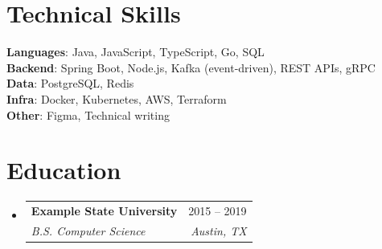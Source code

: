 \documentclass[letterpaper,11pt]{article}
\makeatletter
\newcommand{\resumeSubheading}[4]{
  \vspace{-2pt}\item
    \begin{tabular*}{0.97\textwidth}[t]{l@{\extracolsep{\fill}}r}
      \textbf{#1} & #2 \\
      \textit{\small#3} & \textit{\small #4} \\
    \end{tabular*}\vspace{-7pt}
}
\newcommand{\resumeSubHeadingListStart}{\begin{itemize}[leftmargin=0.15in, label={}]}
\newcommand{\resumeSubHeadingListEnd}{\end{itemize}}
\makeatother
\begin{document}
\section{Technical Skills}
 \begin{itemize}[leftmargin=0.15in, label={}]
    \small{\item{
     \textbf{Languages}{: Java, JavaScript, TypeScript, Go, SQL} \\
     \textbf{Backend}{: Spring Boot, Node.js, Kafka (event-driven), REST APIs, gRPC} \\
     \textbf{Data}{: PostgreSQL, Redis} \\
     \textbf{Infra}{: Docker, Kubernetes, AWS, Terraform} \\
     \textbf{Other}{: Figma, Technical writing}
    }}
 \end{itemize}

\section{Education}
  \resumeSubHeadingListStart
    \resumeSubheading
      {Example State University}{2015 -- 2019}
      {B.S. Computer Science}{Austin, TX}
  \resumeSubHeadingListEnd
\end{document}
